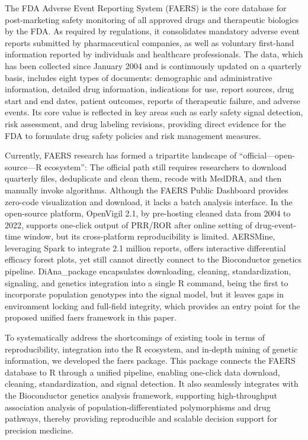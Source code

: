 \documentclass{bioinfo}
\begin{document}
The FDA Adverse Event Reporting System (FAERS) is the core database for
post-marketing safety monitoring of all approved drugs and therapeutic
biologics by the FDA. As required by regulations, it consolidates
mandatory adverse event reports submitted by pharmaceutical companies,
as well as voluntary first-hand information reported by individuals and
healthcare professionals. The data, which has been collected since
January 2004 and is continuously updated on a quarterly basis, includes
eight types of documents: demographic and administrative information,
detailed drug information, indications for use, report sources, drug
start and end dates, patient outcomes, reports of therapeutic failure,
and adverse events. Its core value is reflected in key areas such as
early safety signal detection, risk assessment, and drug labeling
revisions, providing direct evidence for the FDA to formulate drug
safety policies and risk management measures.

Currently, FAERS research has formed a tripartite landscape of
``official---open-source---R ecosystem'': The official path still
requires researchers to download quarterly files, deduplicate and clean
them, recode with MedDRA, and then manually invoke algorithms. Although
the FAERS Public Dashboard provides zero-code visualization and
download, it lacks a batch analysis interface. In the open-source
platform, OpenVigil 2.1, by pre-hosting cleaned data from 2004 to 2022,
supports one-click output of PRR/ROR after online setting of
drug-event-time window, but its cross-platform reproducibility is
limited. AERSMine, leveraging Spark to integrate 2.1 million reports,
offers interactive differential efficacy forest plots, yet still cannot
directly connect to the Bioconductor genetics pipeline. DiAna\_package
encapsulates downloading, cleaning, standardization, signaling, and
genetics integration into a single R command, being the first to
incorporate population genotypes into the signal model, but it leaves
gaps in environment locking and full-field integrity, which provides an
entry point for the proposed unified faers framework in this paper.

To systematically address the shortcomings of existing tools in terms of
reproducibility, integration into the R ecosystem, and in-depth mining
of genetic information, we developed the faers package. This package
connects the FAERS database to R through a unified pipeline, enabling
one-click data download, cleaning, standardization, and signal
detection. It also seamlessly integrates with the Bioconductor genetics
analysis framework, supporting high-throughput association analysis of
population-differentiated polymorphisms and drug pathways, thereby
providing reproducible and scalable decision support for precision
medicine.
\end{document}

